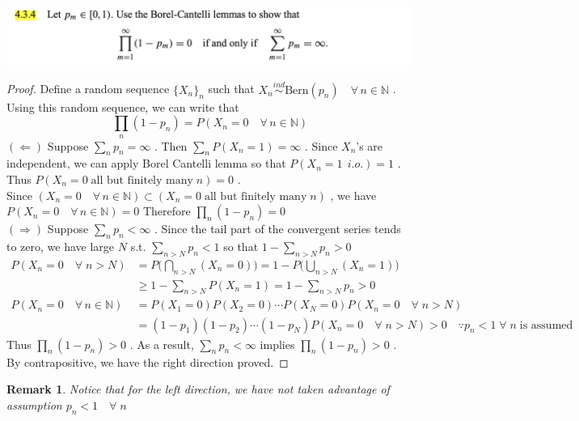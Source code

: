 \documentclass[12pt, A4]{article}
\newtheorem*{remark}{Remark}
\newcommand{\N}{\mathbb{N}}
\newcommand{\foranyn}{\quad \forall \, n\in \N}
\begin{document}
\includegraphics[width=17cm]{Exer4.3.4.png}
\begin{proof}
    Define a random sequence $\{X_n\}_n$ such that $X_n\overset{ind}{\sim} \text{Bern}(p_n)\foranyn$ . Using this random sequence, we can write that $$\prod_n (1-p_n) = P(X_n=0\foranyn) $$ 
    $(\Leftarrow)$ Suppose $\sum_n p_n=\infty$ . Then $\sum_n P(X_n=1)=\infty$ . Since $X_n$'s are independent, we can apply Borel Cantelli lemma so that $P(X_n=1\;\,i.o.)=1$ . Thus $P(X_n=0 \;\text{all but finitely many} \;n)=0$ . \\ Since $(X_n=0\foranyn)\subset (X_n=0 \;\text{all but finitely many} \;n)$ , we have $P(X_n=0 \foranyn)=0$ Therefore $\prod_n (1-p_n)=0$ \\
    $(\Rightarrow)$ Suppose $\sum_n p_n<\infty$ . Since the tail part of the convergent series tends to zero, we have large $N$ s.t. $\sum_{n>N} p_n <1$ so that $1-\sum_{n>N}p_n>0$
    \begin{align*}
        P(X_n=0 \quad\forall \; n>N) &= P\Big(\bigcap_{n>N}(X_n=0)\Big)= 1- P\Big(\bigcup_{n>N}(X_n=1)\Big) \\ &\geq 1-\sum_{n>N}P(X_n=1)=1-\sum_{n>N}p_n>0 \\
        P(X_n=0\foranyn) &= P(X_1=0)P(X_2=0)\cdots P(X_N=0)P(X_n=0\quad \forall\; n>N) \\
        &= (1-p_1)(1-p_2)\cdots(1-p_N)P(X_n=0\quad \forall\; n>N)>0 \quad \because p_n<1\;\forall\;n\; \text{is assumed}
    \end{align*}
    Thus $\prod_n (1-p_n)>0$ . As a result, $\sum_n p_n<\infty$ implies $\prod_n (1-p_n)>0$ . By contrapositive, we have the right direction proved.
\end{proof}
\begin{remark}
    Notice that for the left direction, we have not taken advantage of assumption $p_n<1 \quad \forall\; n$
\end{remark}
\vspace{1cm}
\end{document}
